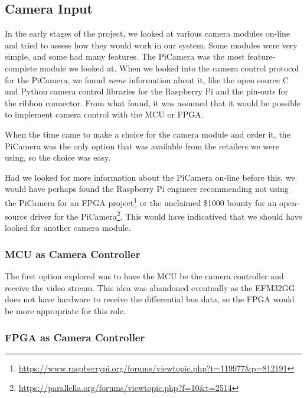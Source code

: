 \subsection{Camera Input}
\label{sec:camera_discussion}
In the early stages of the project,
we looked at various camera modules on-line and tried to assess how they would work in our system.
Some modules were very simple, and some had many features.
The PiCamera was the most feature-complete module we looked at.
When we looked into the camera control protocol for the PiCamera,
we found \textit{some} information about it,
like the open source C and Python camera control libraries for the Raspberry Pi
and the pin-outs for the ribbon connector.
From what found, it was assumed that it would be possible to implement camera control with the MCU or FPGA.

When the time came to make a choice for the camera module and order it,
the PiCamera was the only option that was available from the retailers we were using,
so the choice was easy.

Had we looked for more information about the PiCamera on-line before this,
we would have perhaps found the Raspberry Pi engineer recommending not using the PiCamera for an FPGA project\footnote{\url{https://www.raspberrypi.org/forums/viewtopic.php?t=119977&p=812191}} or the unclaimed \$1000 bounty for an open-source driver for the PiCamera\footnote{\url{https://parallella.org/forums/viewtopic.php?f=10&t=2514}}.
This would have indicatived that we should have looked for another camera module.

\subsubsection{MCU as Camera Controller}

The first option explored was to have the MCU be the camera controller and receive the video stream.
This idea was abandoned eventually as the EFM32GG does not have hardware to receive the differential bus data,
so the FPGA would be more appropriate for this role.

\subsubsection{FPGA as Camera Controller}


